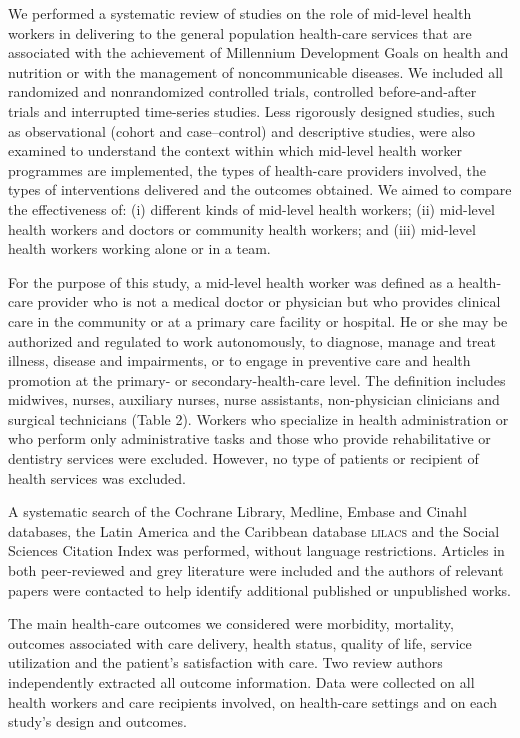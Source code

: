 \documentclass{article}
\begin{document}
We performed a systematic review of studies on the role of mid-level health
workers in delivering
to the general population health-care services that are associated with the
achievement of
Millennium Development Goals on health and nutrition or with the management of
noncommunicable
diseases. We included all randomized and nonrandomized controlled trials,
controlled
before-and-after trials and interrupted time-series studies. Less rigorously
designed studies, such
as observational (cohort and case–control) and descriptive studies, were also
examined to
understand the context within which mid-level health worker programmes are
implemented, the types of
health-care providers involved, the types of interventions delivered and the
outcomes obtained. We
aimed to compare the effectiveness of: (i) different kinds of mid-level health
workers;
(ii) mid-level health workers and doctors or community health workers; and
(iii) mid-level health workers working alone or in a team.

For the purpose of this study, a mid-level health worker was defined as a
health-care provider
who is not a medical doctor or physician but who provides clinical care in the
community or at a
primary care facility or hospital. He or she may be authorized and regulated to
work autonomously,
to diagnose, manage and treat illness, disease and impairments, or to engage in
preventive care and
health promotion at the primary- or secondary-health-care level. The definition
includes midwives,
nurses, auxiliary nurses, nurse assistants, non-physician clinicians and
surgical technicians (Table 2). Workers who specialize in health administration
or
who perform only administrative tasks and those who provide rehabilitative or
dentistry services
were excluded. However, no type of patients or recipient of health services was
excluded.

A systematic search of the Cochrane Library, Medline, Embase and Cinahl
databases, the Latin
America and the Caribbean database \textsc{lilacs} and the Social Sciences Citation Index
was performed,
without language restrictions. Articles in both peer-reviewed and grey
literature were included and
the authors of relevant papers were contacted to help identify additional
published or unpublished
works.

The main health-care outcomes we considered were morbidity, mortality, outcomes
associated with
care delivery, health status, quality of life, service utilization and the
patient's
satisfaction with care. Two review authors independently extracted all outcome
information. Data
were collected on all health workers and care recipients involved, on
health-care settings and on
each study's design and outcomes.
\end{document}

